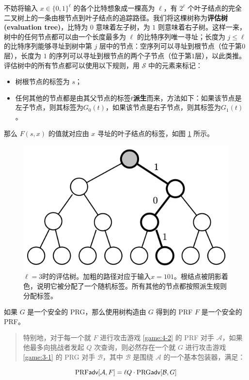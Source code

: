不妨将输入 $x\in\{0,1\}^\ell$ 的各个比特想象成一棵高为 $\ell$，有 $2^\ell$ 个叶子结点的完全二叉树上的一条由根节点到叶子结点的追踪路径。我们将这棵树称为\textbf{评估树 (evaluation tree)}，比特为 $0$ 意味着左子树，为 $1$ 则意味着右子树。这样一来，树中的任何节点都可以由一个长度最多为 $\ell$ 的比特序列唯一寻址；长度为 $j\leq\ell$ 的比特序列能够寻址到树中第 $j$ 层中的节点：空序列可以寻址到根节点（位于第$0$层），长度为 $1$ 的序列可以寻址到根节点的两个子节点（位于第$1$层），以此类推。评估树中的所有节点都可以使用以下规则，用 $\mathcal{S}$ 中的元素来标记：
\begin{itemize}
	\item 树根节点的标签为 $s$；
	\item 任何其他的节点都是由其父节点的标签$t$\textbf{派生}而来，方法如下：如果该节点是左子节点，则其标签为$G_0(t)$，如果该节点是右子节点，则其标签为$G_1(t)$。
\end{itemize}
那么 $F(s,x)$ 的值就对应由 $x$ 寻址的叶子结点的标签，如图 \ref{fig:4-15} 所示。

\begin{figure}
  \centering
  \includegraphics[width=0.35\linewidth]{figures/chapter4/fig15.png}
  \caption{$\ell=3$时的评估树。加粗的路径对应于输入$x=101$。根结点被阴影着色，说明它被分配了一个随机标签。所有其他的节点都按照派生规则分配标签。}
  \label{fig:4-15}
\end{figure}

\begin{theorem}\label{theo:4-10}
如果 $G$ 是一个安全的 PRG，那么使用树构造由 $G$ 得到的 PRF $F$ 是一个安全的 PRF。
\begin{quote}
特别地，对于每一个就 $F$ 进行攻击游戏 \ref{game:4-2} 的 PRF 对手 $\mathcal{A}$，如果他最多向挑战者发起 $Q$ 次查询，则必然存在一个就 $G$ 进行攻击游戏 \ref{game:3-1} 的 PRG 对手 $\mathcal{B}$，其中 $\mathcal{B}$ 是围绕 $\mathcal{A}$ 的一个基本包装器，满足：
\end{quote}
\[
{\rm PRF\mathsf{adv}}[\mathcal{A},F]=\ell Q\cdot{\rm PRG\mathsf{adv}}[\mathcal{B},G]
\]
\end{theorem}

